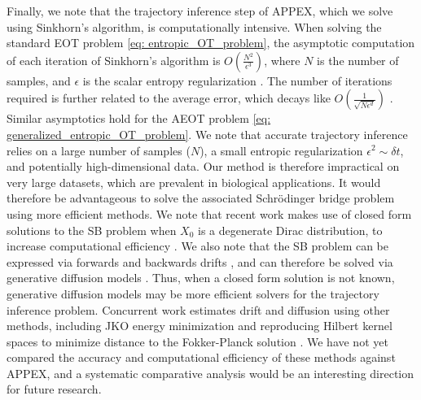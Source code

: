\documentclass[twoside,11pt]{article}
\begin{document}
Finally, we note that the trajectory inference step of APPEX, which we solve using Sinkhorn's algorithm, is computationally intensive. When solving the standard EOT problem \eqref{eq: entropic_OT_problem}, the asymptotic computation of each iteration of Sinkhorn's algorithm is $O(\frac{N^2}{\epsilon^3})$, where $N$ is the number of samples, and $\epsilon$ is the scalar entropy regularization \citep{altschuler2017near}. The number of iterations required is further related to the average error, which decays like $O(\frac{1}{\sqrt{N\epsilon^{d}}})$ 
\citep{genevay2019sample}. Similar asymptotics hold for the AEOT problem \eqref{eq: generalized_entropic_OT_problem}. We note that accurate trajectory inference relies on a large number of samples ($N$), a small entropic regularization $\epsilon^2 \sim \delta t$, and potentially high-dimensional data. Our method is therefore impractical on very large datasets, which are prevalent in biological applications. It would therefore be advantageous to solve the associated Schr\"odinger bridge problem using more efficient methods. We note that recent work makes use of closed form solutions to the SB problem when $X_0$ is a degenerate Dirac distribution, to increase computational efficiency \citep{huang2024one}. We also note that the SB problem can be expressed via forwards and backwards drifts \citep{vargas2021solving}, and can therefore be solved via generative diffusion models \citep{de2021diffusion, shi2024diffusion}. Thus, when a closed form solution is not known, generative diffusion models may be more efficient solvers for the trajectory inference problem. Concurrent work estimates drift and diffusion using other methods, including JKO energy minimization \citep{terpin2024learning} and reproducing Hilbert kernel spaces to minimize distance to the Fokker-Planck solution \citep{brogat2024learning}. We have not yet compared the accuracy and computational efficiency of these methods against APPEX, and a systematic comparative analysis would be an interesting direction for future research. 







\end{document}
